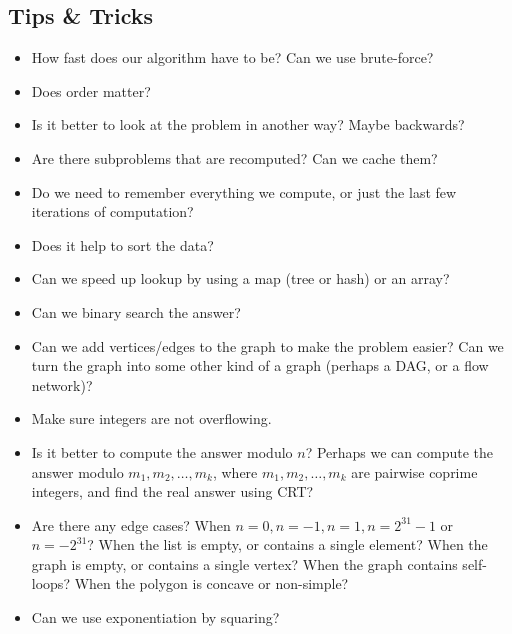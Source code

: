 \documentclass[10pt,a4paper,titlepage]{article}
\begin{document}
		\subsection{Tips \&{} Tricks}
			\begin{itemize}
				\item How fast does our algorithm have to be? Can we use brute-force?
				\item Does order matter?
				\item Is it better to look at the problem in another way? Maybe backwards?
				\item Are there subproblems that are recomputed? Can we cache them?
				\item Do we need to remember everything we compute, or just the last few iterations of computation?
				\item Does it help to sort the data?
				\item Can we speed up lookup by using a map (tree or hash) or an array?
				\item Can we binary search the answer?
				\item Can we add vertices/edges to the graph to make the problem easier? Can we turn the graph into some other kind of a graph (perhaps a DAG, or a flow network)?
				\item Make sure integers are not overflowing.
				\item Is it better to compute the answer modulo $n$? Perhaps we can compute the answer modulo $m_1,m_2,\ldots,m_k$, where $m_1,m_2,\ldots,m_k$ are pairwise coprime integers, and find the real answer using CRT?
				\item Are there any edge cases? When $n=0, n=-1, n=1, n=2^{31}-1$ or $n=-2^{31}$? When the list is empty, or contains a single element? When the graph is empty, or contains a single vertex? When the graph contains self-loops?  When the polygon is concave or non-simple?
				\item Can we use exponentiation by squaring?
			\end{itemize}
\end{document}
